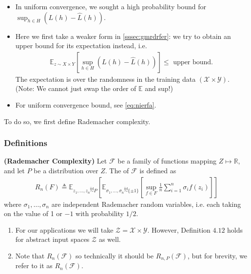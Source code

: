 \documentclass{article}
\newcommand{\bfs}[1]{\textbf{({#1}) }}
\begin{document}
\begin{itemize}
    \item In uniform convergence, we sought a high probability bound for $\sup _{h \in H}(L(h)-\hat{L}(h))$. 
    \item Here we first take a weaker form in \cref{sssec:gmrdrfer}: we try to obtain an upper bound for its expectation instead, i.e.
\begin{align*}
\mathbb{E}_{z \sim X \times Y}\left[\sup _{h \in H}(L(h)-\hat{L}(h))\right] \leq \text { upper bound. }
\end{align*}
The expectation is over the randomness in the training data $(\mathcal{X} \times \mathcal{Y})$. (Note: We cannot just swap the order of $\mathbb{E}$ and sup!)
\item For uniform convergence bound, see \cref{eq:nierfa}.
\end{itemize}

To do so, we first define Rademacher complexity.
\subsubsection{Definitions}

\begin{defa}\bfs{Rademacher Complexity}
  Let $\mathcal{F}$ be a family of functions mapping $Z \mapsto \mathbb{R}$, and let $P$ be a distribution over $Z$. The  of $\mathcal{F}$ is defined as
  \begin{align}
      R_{n}(F) \triangleq \mathbb{E}_{z_{1}, \ldots, z_{n} \stackrel{\mathrm{iid}}{\sim} P}\left[\mathbb{E}_{\sigma_{1}, \ldots, \sigma_{n}\stackrel{\mathrm{iid}}{\sim}\{\pm 1\}} \left[\sup _{f \in F} \frac{1}{n} \sum_{i=1}^{n} \sigma_{i} f\left(z_{i}\right)\right]\right]
  \end{align}
where $\sigma_{1}, \ldots, \sigma_{n}$ are independent Rademacher random variables, i.e. each taking on the value of 1 or $-1$ with probability $1 / 2$.
\end{defa}



\begin{rema}\text{ \\}
\begin{enumerate}
    \item For our applications we will take $\mathcal{Z}=\mathcal{X} \times \mathcal{Y}$. However, Definition $4.12$ holds for abstract input spaces $\mathcal{Z}$ as well.
    \item Note that $R_{n}(\mathcal{F})$   so technically it should be $R_{n, P}(\mathcal{F})$, but for brevity, we refer to it as $R_{n}(\mathcal{F})$.
\end{enumerate}
\end{rema}
\end{document}
